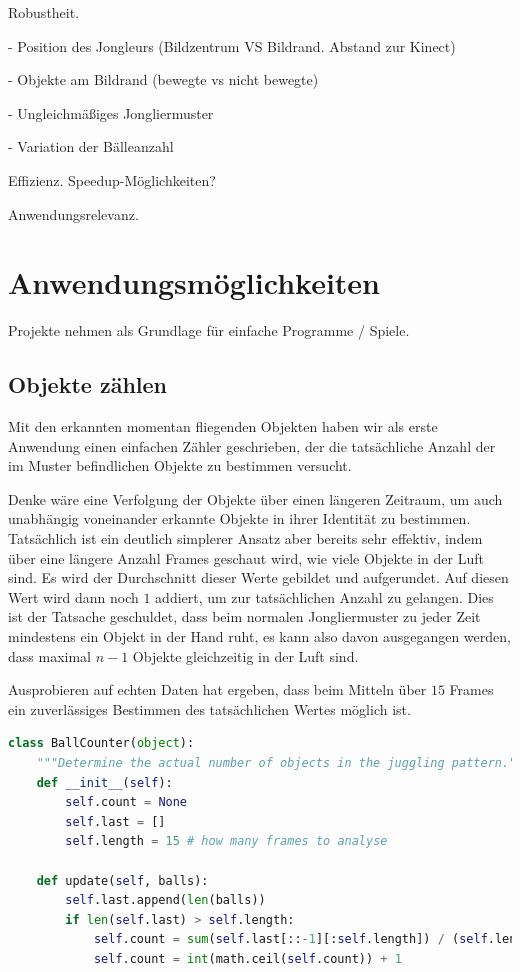 \documentclass[12pt,a4paper,ngerman]{scrartcl}
\begin{document}
Robustheit.

  - Position des Jongleurs (Bildzentrum VS Bildrand. Abstand zur Kinect)
  
  - Objekte am Bildrand (bewegte vs nicht bewegte)
  
  - Ungleichmäßiges Jongliermuster
  
  - Variation der Bälleanzahl

Effizienz. Speedup-Möglichkeiten?

Anwendungsrelevanz.

\section{Anwendungsmöglichkeiten}

Projekte nehmen als Grundlage für einfache Programme / Spiele.

\subsection{Objekte zählen}

Mit den erkannten momentan fliegenden Objekten haben wir als erste Anwendung einen
einfachen Zähler geschrieben, der die tatsächliche Anzahl der im Muster befindlichen Objekte zu bestimmen versucht.

Denke wäre eine Verfolgung der Objekte über einen längeren Zeitraum, um auch 
unabhängig voneinander erkannte Objekte in ihrer Identität zu bestimmen. Tatsächlich
ist ein deutlich simplerer Ansatz aber bereits sehr effektiv, indem über eine 
längere Anzahl Frames geschaut wird, wie viele Objekte in der Luft sind. Es wird der 
Durchschnitt dieser Werte gebildet und aufgerundet. Auf diesen Wert wird dann noch 
$1$ addiert, um zur tatsächlichen Anzahl zu gelangen. Dies ist der Tatsache 
geschuldet, dass beim normalen Jongliermuster zu jeder Zeit mindestens ein Objekt in der Hand ruht, es kann also davon ausgegangen werden, dass maximal $n - 1$ Objekte 
gleichzeitig in der Luft sind.

Ausprobieren auf echten Daten hat ergeben, dass beim Mitteln über $15$ Frames
ein zuverlässiges Bestimmen des tatsächlichen Wertes möglich ist.

\begin{lstlisting}[language=Python]
class BallCounter(object):
    """Determine the actual number of objects in the juggling pattern."""
    def __init__(self):
        self.count = None
        self.last = []
        self.length = 15 # how many frames to analyse

    def update(self, balls):
        self.last.append(len(balls))
        if len(self.last) > self.length:
            self.count = sum(self.last[::-1][:self.length]) / (self.length*1.0)
            self.count = int(math.ceil(self.count)) + 1
\end{lstlisting}
\end{document}
